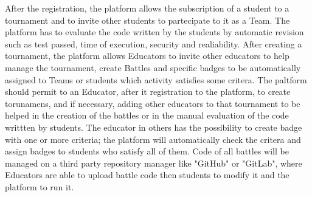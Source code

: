 After the registration, the platform allows the subscription of a student to a tournament and to invite other students to partecipate to it as a Team. The platform has to evaluate the code written by the students by automatic revision such as test passed, time of execution, security and realiability.
After creating a tournament, the platform allows Educators to invite other educators to help manage the tournament, create Battles and specific badges to be automatically assigned to Teams or students which activity satisfies some critera.
The paltform should permit to an Educator, after it registration to the platform, to create torunamens, and if necessary, adding other educators to that tournament to be helped in the creation of the battles or in the manual evaluation of the code writtten by students. 
The educator in others has the possibility to create badge with one or more criteria; the platform will automatically check the critera and assign badges to students who satisfy all of them.
Code of all battles will be managed on a third party repository manager like "GitHub" or "GitLab", where Educators are able to upload battle code then students to modify it and the platform to run it.
